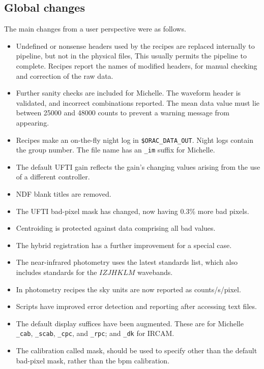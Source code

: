 \documentclass[twoside,11pt,nolof]{starlink}
\begin{document}
\subsection{Global changes}

The main changes from a user perspective were as follows.

\begin{itemize}
   \item Undefined or nonsense headers used by the recipes are
   replaced internally to pipeline, but not in the physical files,
   This usually permits the pipeline to complete.   Recipes report
   the names of modified headers, for manual checking and correction
   of the raw data.

   \item Further sanity checks are included for Michelle.  The
   waveform header is validated, and incorrect combinations reported.
   The mean data value must lie between 25000 and 48000 counts to
   prevent a warning message from appearing.

   \item Recipes make an on-the-fly night log in \texttt{\$ORAC\_DATA\_OUT}.
   Night logs contain the group number.  The file name has an
   \texttt{\_im} suffix for Michelle.

   \item The default UFTI gain reflects the gain's changing values arising
   from the use of a different controller.

   \item NDF blank titles are removed.

   \item The UFTI bad-pixel mask has changed, now having 0.3\% more
   bad pixels.

   \item Centroiding is protected against data comprising all bad
   values.

   \item The hybrid registration has a further improvement for a special
   case.

   \item The near-infrared photometry uses the latest standards list,
   which also includes standards for the $IZJHKLM$ wavebands.

   \item In photometry recipes the sky units are now reported as
   counts/s/pixel.

   \item Scripts have improved error detection and reporting after accessing
   text files.

   \item The default display suffices have been augmented.  These are
   for Michelle {\tt\_cab}, {\tt\_scab}, {\tt\_cpc}, and {\tt\_rpc}; and
   {\tt\_dk} for IRCAM.

   \item The calibration called mask, should be used to specify other
   than the default bad-pixel mask, rather than the bpm calibration.
\end{itemize}
\end{document}
